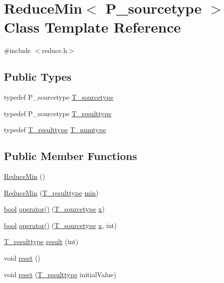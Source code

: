 \hypertarget{classReduceMin}{}\section{Reduce\+Min$<$ P\+\_\+sourcetype $>$ Class Template Reference}
\label{classReduceMin}


{\ttfamily \#include $<$reduce.\+h$>$}

\subsection*{Public Types}
\begin{DoxyCompactItemize}
\item 
typedef P\+\_\+sourcetype \hyperlink{classReduceMin_a7e14cd389f6cd755ec4dd2e224dcc969}{T\+\_\+sourcetype}
\item 
typedef P\+\_\+sourcetype \hyperlink{classReduceMin_a80cd05c565051ac4bcfdbb85b6c4d9fb}{T\+\_\+resulttype}
\item 
typedef \hyperlink{classReduceMin_a80cd05c565051ac4bcfdbb85b6c4d9fb}{T\+\_\+resulttype} \hyperlink{classReduceMin_a28eb01a636caef7d9430a57a4f6943a4}{T\+\_\+numtype}
\end{DoxyCompactItemize}
\subsection*{Public Member Functions}
\begin{DoxyCompactItemize}
\item 
\hyperlink{classReduceMin_ae8ca1a261463cc1f3d4ebbc9d5d1fbf7}{Reduce\+Min} ()
\item 
\hyperlink{classReduceMin_a46db91be9c745719b03552a24c6f4d45}{Reduce\+Min} (\hyperlink{classReduceMin_a80cd05c565051ac4bcfdbb85b6c4d9fb}{T\+\_\+resulttype} \hyperlink{vecbfn_8cc_aa3e27e02424d28adfcf9d2b934e741a1}{min})
\item 
\hyperlink{compiler_8h_abb452686968e48b67397da5f97445f5b}{bool} \hyperlink{classReduceMin_ad1ba0e0854398ec097e143521f6000d6}{operator()} (\hyperlink{classReduceMin_a7e14cd389f6cd755ec4dd2e224dcc969}{T\+\_\+sourcetype} \hyperlink{vecnorm1_8cc_ac73eed9e41ec09d58f112f06c2d6cb63}{x})
\item 
\hyperlink{compiler_8h_abb452686968e48b67397da5f97445f5b}{bool} \hyperlink{classReduceMin_a5822ce02d646f0a939b57d1387a8fa4e}{operator()} (\hyperlink{classReduceMin_a7e14cd389f6cd755ec4dd2e224dcc969}{T\+\_\+sourcetype} \hyperlink{vecnorm1_8cc_ac73eed9e41ec09d58f112f06c2d6cb63}{x}, int)
\item 
\hyperlink{classReduceMin_a80cd05c565051ac4bcfdbb85b6c4d9fb}{T\+\_\+resulttype} \hyperlink{classReduceMin_ae0a4a061c4bbff8ba50c404f2250c9ac}{result} (int)
\item 
void \hyperlink{classReduceMin_ad026a5eaff844578fa2c340e8e6ceca8}{reset} ()
\item 
void \hyperlink{classReduceMin_ad51bc013258cc8fbc0a13e57b627b2ca}{reset} (\hyperlink{classReduceMin_a80cd05c565051ac4bcfdbb85b6c4d9fb}{T\+\_\+resulttype} initial\+Value)
\end{DoxyCompactItemize}
